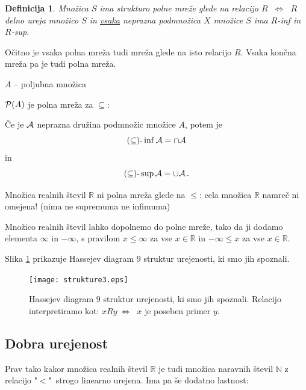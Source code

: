 \documentclass[11pt,paper=b5,footinclude,headinclude]{scrbook} %
\newcounter{example}
\def\cee {{~\Leftrightarrow~}}
\newtheorem*{definicija}{Definicija}
\begin{document}
\begin{definicija}
Množica $S$ ima strukturo {\em polne mreže} glede na relacijo $R$ $\cee$
$R$ delno ureja množico $S$ in \underline{vsaka} neprazna podmnožica $X$ množice $S$ ima $R$-inf in $R$-sup.
\end{definicija}

Očitno je vsaka polna mreža tudi mreža glede na isto relacijo $R$. Vsaka končna mreža pa je tudi polna mreža.

\bigskip
\begin{example*}

$A$ -- poljubna množica

${\cal P}(A)$ je polna mreža za $\subseteq$:

Če je ${\cal A}$ neprazna družina podmnožic množice $A$, potem je
$$(\subseteq)\textrm{-}\inf {\cal A} = \cap {\cal A}$$
in
$$(\subseteq)\textrm{-}\sup {\cal A} = \cup {\cal A}\,.$$\end{example*}

\bigskip

Množica realnih števil $\mathbb{R}$ ni polna mreža glede na $\le$: cela množica $\mathbb{R}$ namreč ni omejena! (nima ne supremuma ne infimuma)

Množico realnih števil lahko dopolnemo do polne mreže, tako da ji dodamo elementa $\infty$ in $-\infty$, s pravilom $x\le \infty$ za vse $x\in \mathbb R$ in $-\infty\le x$ za vse $x\in \mathbb R$.

Slika \ref{fig:hasse9} prikazuje Hassejev diagram $9$ struktur urejenosti, ki smo jih spoznali. 

\begin{figure}
    \centering
    \texttt{[image: strukture3.eps]}
    \caption{Hassejev diagram $9$ struktur urejenosti, ki smo jih spoznali. Relacijo interpretiramo kot: $xRy\cee$ $x$ je poseben primer $y$.}
    \label{fig:hasse9}
\end{figure}
\begin{center}

\end{center}





\subsection{Dobra urejenost}

Prav tako kakor množica realnih števil $\mathbb{R}$ je tudi množica naravnih števil $\mathbb{N}$
 z relacijo "$<$"~strogo linearno urejena.
Ima pa še dodatno lastnost:
\end{document}
